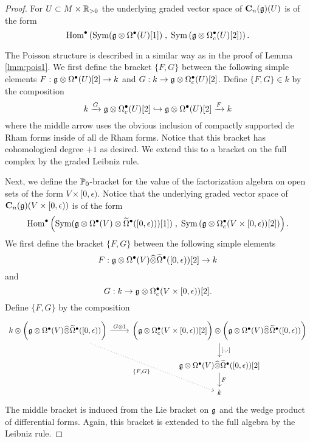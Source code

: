 \documentclass[11pt]{amsart}
\numberwithin{equation}{section}
\begin{document}
\begin{proof}
For $U \subset M \times \mathbb R_{>0}$ the underlying graded vector space of $\mathbf C_n(\mathfrak g)(U)$ is of the form
\[
{\rm Hom}^\bullet\left({\rm Sym}(\mathfrak g \otimes \Omega^\bullet (U)[1]) \; , \; {\rm Sym}  \left(\mathfrak g \otimes \Omega^\bullet_c(U) [2] \right) \right)  .
\]

The Poisson structure is described in a similar way as in the proof of Lemma \ref{lmm:pois1}. 
We first define the bracket $\{F,G\}$ between the following simple elements $F : \mathfrak g \otimes \Omega^\bullet (U)[2] \to k$ and $G : k \to \mathfrak g \otimes \Omega^\bullet_c(U)[2]$. 
Define $\{F, G\} \in k$ by the composition
\[
k \xrightarrow{G} \mathfrak g \otimes \Omega^\bullet_c(U)[2] \hookrightarrow \mathfrak g \otimes \Omega^\bullet(U)[2] \xrightarrow{F} k
\]
where the middle arrow uses the obvious inclusion of compactly supported de Rham forms inside of all de Rham forms. 
Notice that this bracket has cohomological degree $+1$ as desired.
We extend this to a bracket on the full complex by the graded Leibniz rule. 

Next, we define the $\mathbb P_0$-bracket for the value of the factorization algebra on open sets of the form $V \times [0,\epsilon)$. 
Notice that the underlying graded vector space of $\mathbf C_n(\mathfrak g)(V \times [0,\epsilon))$ is of the form
\[
{\rm Hom}^\bullet\left({\rm Sym}(\mathfrak g \otimes \Omega^\bullet (V) \otimes \widetilde{\Omega}^\bullet ([0,\epsilon))) [1]) \; , \; {\rm Sym} \left(\mathfrak g \otimes \Omega^\bullet_c(V \times [0,\epsilon)) [2] \right) \right)  .
\]
We first define the bracket $\{F,G\}$ between the following simple elements 
\[
F : \mathfrak g \otimes \Omega^\bullet(V) \widehat{\otimes} \widetilde{\Omega}^\bullet([0,\epsilon)) [2] \to k
\]
and 
\[
G : k \to \mathfrak g \otimes \Omega^\bullet_c(V \times [0,\epsilon))[2] .
\]
Define $\{F, G\}$ by the composition
\[
\begin{tikzcd}
k \otimes \bigg(\fg \otimes \Omega^\bu(V) \Hat{\otimes} \Tilde{\Omega}^\bu([0,\epsilon)) \bigg) \ar[rdd, dotted, "{\{F,G\}}"'] \ar[r, "G \otimes 1"] & 
\bigg(\fg \otimes \Omega^\bu_c(V \times [0,\epsilon)) [2]\bigg) \otimes \bigg(\fg \otimes \Omega^\bu(V) \Hat{\otimes} \Tilde{\Omega}^\bu([0,\epsilon)) \bigg) \ar[d,"{[\cdot, \cdot]}"] \\
& \fg \otimes \Omega^\bu(V) \Hat{\otimes} \Tilde{\Omega}^\bu([0,\epsilon)) [2] \ar[d, "F"] \\ & k
\end{tikzcd}
\]
The middle bracket is induced from the Lie bracket on $\mathfrak g$ and the wedge product of differential forms.
Again, this bracket is extended to the full algebra by the Leibniz rule.
\end{proof}
\end{document}
